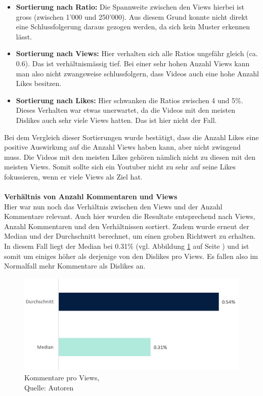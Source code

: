 \documentclass[12pt,titlepage]{article}
\begin{document}
\begin{itemize}
\item \textbf{Sortierung nach Ratio:} Die Spannweite zwischen den Views hierbei ist gross (zwischen 1'000 und 250'000). Aus diesem Grund konnte nicht direkt eine Schlussfolgerung daraus gezogen werden, da sich kein Muster erkennen lässt.
\item \textbf{Sortierung nach Views:} Hier verhalten sich alle Ratios ungefähr gleich (ca. 0.6). Das ist verhältnismässig tief. Bei einer sehr hohen Anzahl Views kann man also nicht zwangsweise schlussfolgern, dass Videos auch eine hohe Anzahl Likes besitzen. 
\item \textbf{Sortierung nach Likes:} Hier schwanken die Ratios zwischen 4 und 5\%. Dieses Verhalten war etwas unerwartet, da die Videos mit den meisten Dislikes auch sehr viele Views hatten. Das ist hier nicht der Fall.  
\end{itemize}
Bei dem Vergleich dieser Sortierungen wurde bestätigt, dass die Anzahl Likes eine positive Auswirkung auf die Anzahl Views haben kann, aber nicht zwingend muss. Die Videos mit den meisten Likes gehören nämlich nicht zu diesen mit den meisten Views. Somit sollte sich ein Youtuber nicht zu sehr auf seine Likes fokussieren, wenn er viele Views als Ziel hat.\\
\\
\textbf{Verhältnis von Anzahl Kommentaren und Views}\\
Hier war nun noch das Verhältnis zwischen den Views und der Anzahl Kommentare relevant. Auch hier wurden die Resultate entsprechend nach Views, Anzahl Kommentaren und den Verhältnissen sortiert. Zudem wurde erneut der Median und der Durchschnitt berechnet, um einen groben Richtwert zu erhalten. In diesem Fall liegt der Median bei 0.31\% (vgl. Abbildung \ref{img:Kommentare pro Views} auf Seite \pageref{img:Kommentare pro Views}) und ist somit um einiges höher als derjenige von den Dislikes pro Views. Es fallen also im Normalfall mehr Kommentare als Dislikes an.

\begin{figure}[h]
	\centering
	\includegraphics[width=12cm]{IMG/grafik_commentsviews.JPG}
	\caption[Kommentare pro Views]{Kommentare pro Views,\\ Quelle: Autoren}
	\label{img:Kommentare pro Views}
\end{figure}
\end{document}
